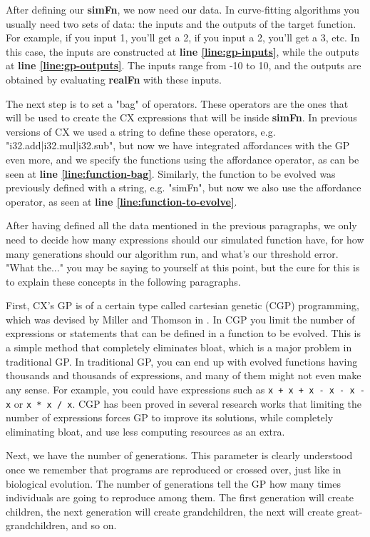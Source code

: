 \documentclass[11pt,fleqn,openany]{book} %
\begin{document}
After defining our \textbf{simFn}, we now need our data. In curve-fitting algorithms you usually need two sets of data: the inputs and the outputs of the target function. For example, if you input 1, you'll get a 2, if you input a 2, you'll get a 3, etc. In this case, the inputs are constructed at \textbf{line \ref{line:gp-inputs}}, while the outputs at \textbf{line \ref{line:gp-outputs}}. The inputs range from -10 to 10, and the outputs are obtained by evaluating \textbf{realFn} with these inputs.

The next step is to set a "bag" of operators. These operators are the ones that will be used to create the CX expressions that will be inside \textbf{simFn}. In previous versions of CX we used a string to define these operators, e.g. "i32.add|i32.mul|i32.sub", but now we have integrated affordances with the GP even more, and we specify the functions using the affordance operator, as can be seen at \textbf{line \ref{line:function-bag}}. Similarly, the function to be evolved was previously defined with a string, e.g. "simFn", but now we also use the affordance operator, as seen at \textbf{line \ref{line:function-to-evolve}}.

After having defined all the data mentioned in the previous paragraphs, we only need to decide how many expressions should our simulated function have, for how many generations should our algorithm run, and what's our threshold error. "What the..." you may be saying to yourself at this point, but the cure for this is to explain these concepts in the following paragraphs.

First, CX's GP is of a certain type called cartesian genetic (CGP) programming, which was devised by Miller and Thomson in \cite{miller2000cartesian}. In CGP you limit the number of expressions or statements that can be defined in a function to be evolved. This is a simple method that completely eliminates bloat, which is a major problem in traditional GP. In traditional GP, you can end up with evolved functions having thousands and thousands of expressions, and many of them might not even make any sense. For example, you could have expressions such as \lstinline{x + x + x - x - x - x} or \lstinline{x * x / x}. CGP has been proved in several research works that limiting the number of expressions forces GP to improve its solutions, while completely eliminating bloat, and use less computing resources as an extra.

Next, we have the number of generations. This parameter is clearly understood once we remember that programs are reproduced or crossed over, just like in biological evolution. The number of generations tell the GP how many times individuals are going to reproduce among them. The first generation will create children, the next generation will create grandchildren, the next will create great-grandchildren, and so on.
\end{document}
